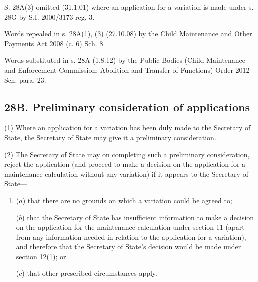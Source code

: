 \documentclass[a4paper]{article}
\begin{document}
{{S. 28A(3) omitted (31.1.01) where an application for a variation is made under s. 28G by S.I. 2000/3173 reg. 3.

Words repealed in s. 28A(1), (3) (27.10.08) by the Child Maintenance and Other Payments Act 2008 (c. 6) Sch. 8.

Words substituted in s. 28A (1.8.12) by the Public Bodies (Child Maintenance and Enforcement Commission: Abolition and Transfer of Functions) Order 2012 Sch. para. 23.
}

\subsection{28B. Preliminary consideration of applications}

(1) Where an application for a variation has been duly made to the Secretary of State, the Secretary of State may give it a preliminary consideration.

(2) The Secretary of State may on completing such a preliminary consideration, reject the application (and proceed to make a decision on the application for a maintenance calculation without any variation) if it appears to the Secretary of State---
\begin{enumerate}\item[]
($a$) that there are no grounds on which a variation could be agreed to;

($b$) that the Secretary of State has insufficient information to make a decision on the application for the maintenance calculation under section 11 (apart from any information needed in relation to the application for a variation), and therefore that the Secretary of State's decision would be made under section 12(1); or

($c$) that other prescribed circumstances apply.
\end{enumerate}

}
\end{document}
